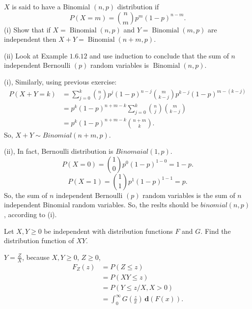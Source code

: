 \documentclass[en, normal, 11pt, black]{elegantnote}
\newenvironment{exercise}[1]{\begin{tcolorbox}[colback=black!15, colframe=black!80, breakable, title=#1]}{\end{tcolorbox}}
\renewenvironment{proof}{\begin{tcolorbox}[colback=white, colframe=black!50, breakable, title=Proof. ]\setlength{\parskip}{0.8em}}{\,\\\rightline{$\square$}\end{tcolorbox}}
\newcommand{\der}{\,\mathbf{d}}
\begin{document}
    \begin{exercise}{2.1.12}
        $X$ is said to have a Binomial $(n, p)$ distribution if
        \[
            P(X=m)=\binom{n}{m}p^{m}(1-p)^{n-m}. 
        \]
    (i) Show that if $X=\operatorname{Binomial}(n, p)$ and $Y=\operatorname{Binomial}(m, p)$ are independent then $X+Y=\operatorname{Binomial}(n+m, p)$. 
    
    (ii) Look at Example $1.6 .12$ and use induction to conclude that the sum of $n$ independent Bernoulli $(p)$ random variables is $\operatorname{Binomial}(n, p)$. 
    \end{exercise}

    \begin{proof}
        (i), Similarly, using previous exercise: 
        \[
            \begin{aligned}
            P(X+Y=k) &=\sum_{j=0}^{k}\binom{n}{j} p^{j}(1-p)^{n-j}\binom{m}{k-j} p^{k-j}(1-p)^{m-(k-j)} \\
            &=p^{k}(1-p)^{n+m-k} \sum_{j=0}^{k}\binom{n}{j}\binom{m}{k-j} \\
            &=p^{k}(1-p)^{n+m-k}\binom{n+m}{k}. 
            \end{aligned}
        \]
        So, $X+Y\sim Binomial(n+m,p)$. 

        (ii), In fact, Bernoulli distribution is $Binomaial(1,p)$. 
        \[
            P(X=0)=\binom{1}{0}p^0(1-p)^{1-0}=1-p. 
        \]
        \[
            P(X=1)=\binom{1}{1}p^1(1-p)^{1-1}=p. 
        \]
        So, the sum of $n$ independent Bernoulli $(p)$ random variables is the sum of $n$ independent Binomial random variables. So, the reslts should be $binomial(n,p)$, according to (i). 
    \end{proof}

    \begin{exercise}{2.1.14}
        Let $X, Y \geqslant 0$ be independent with distribution functions $F$ and $G$. Find the distribution function of $X Y$. 
    \end{exercise}

    \begin{proof}
        $Y=\frac{Z}{X}$, because $X,Y\geqslant0$, $Z\geqslant0$, 
        \[
            \begin{aligned}
                F_{Z}(z) &= P(Z \leqslant z) \\
                &=P(X Y \leqslant z) \\
                &=P(Y \leqslant z / X, X > 0) \\
                &=\int_{0}^{\infty} G\left(\frac{z}{x}\right) \der (F(x)). 
            \end{aligned}
        \]
        \vspace*{-30pt}
    \end{proof}
\end{document}
